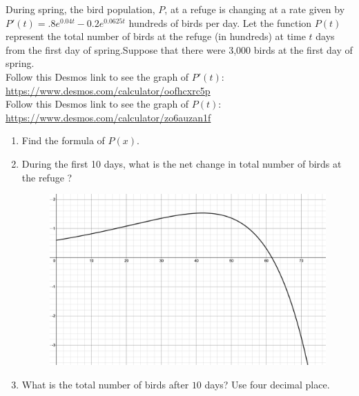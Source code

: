 \begin{example}
During spring, the bird population, $P$, at a refuge is changing at a rate given by $P'(t)=.8e^{0.04t}-0.2e^{0.0625t}$ hundreds of birds per day.  Let the function $P(t)$ represent the total number of birds at the refuge (in hundreds) at time $t$ days from the first day of spring.Suppose that there were 3,000 birds at the first day of spring.  \\
\newline 
Follow this Desmos link to see the graph of $P'(t)$: \url{https://www.desmos.com/calculator/oofhcxrc5p}\\
Follow this Desmos link to see the graph of $P(t)$: \url{https://www.desmos.com/calculator/zo6auzan1f}
\renewcommand{\labelenumi}{\textbf{(\alph{enumi})}}
\begin{enumerate}[leftmargin=*]
\item Find the formula of $P(x)$.  
\item During the first 10 days, what is the net change in total number of birds at the refuge ? 
    \begin{figure}[h!]
        \flushleft
        \includegraphics[scale=0.20]{images/netChange/birdPopulation1.png}
    \end{figure}
\item  What is the total number of birds after $10$ days? Use four decimal place.
    \begin{figure}[h!]
        \flushleft

\end{figure}
\end{enumerate}
\end{example}

